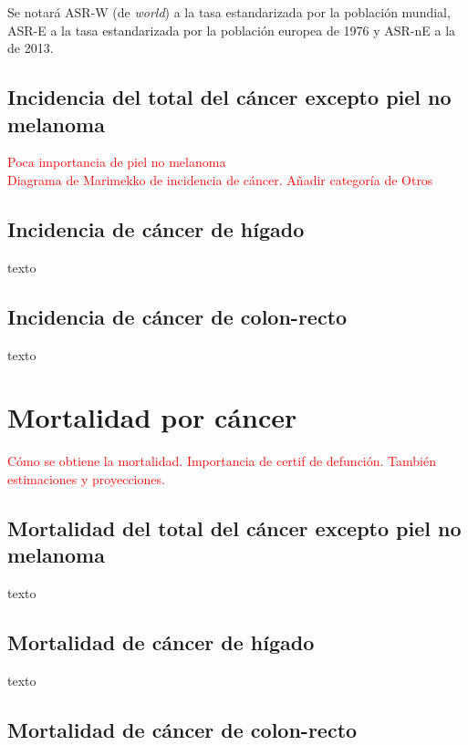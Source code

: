 \noindent Se notará ASR-W (de \textit{world}) a la tasa estandarizada por la población mundial, ASR-E a la tasa estandarizada por la población europea de 1976 y ASR-nE a la de 2013.\\

\subsection{Incidencia del total del cáncer excepto piel no melanoma}

\textcolor{red}{Poca importancia de piel no melanoma}\\

\textcolor{red}{Diagrama de Marimekko de incidencia de cáncer. Añadir categoría de Otros}

\subsection{Incidencia de cáncer de hígado}

texto

\subsection{Incidencia de cáncer de colon-recto}

texto

\section{Mortalidad por cáncer}

\textcolor{red}{Cómo se obtiene la mortalidad. Importancia de certif de defunción. También estimaciones y proyecciones.}

\subsection{Mortalidad del total del cáncer excepto piel no melanoma}

texto

\subsection{Mortalidad de cáncer de hígado}

texto

\subsection{Mortalidad de cáncer de colon-recto}

